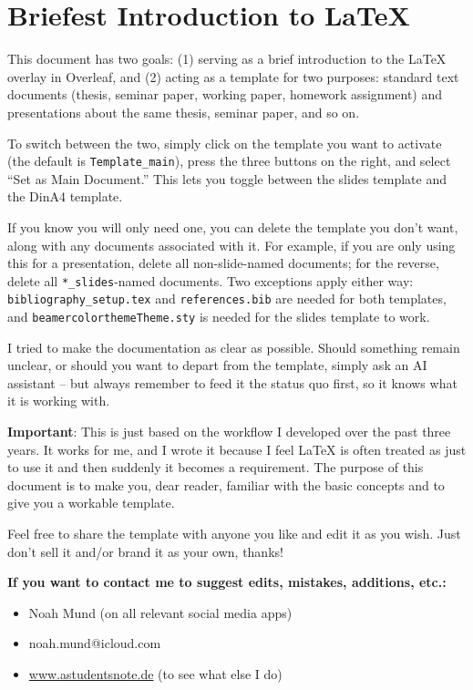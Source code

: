 \section{Briefest Introduction to LaTeX}
\label{sec:Intro}

This document has two goals: (1) serving as a brief introduction to the LaTeX overlay in Overleaf, and (2) acting as a template for two purposes: standard text documents (thesis, seminar paper, working paper, homework assignment) and presentations about the same thesis, seminar paper, and so on.

To switch between the two, simply click on the template you want to activate (the default is \texttt{Template\_main}), press the three buttons on the right, and select ``Set as Main Document.'' This lets you toggle between the slides template and the DinA4 template.

If you know you will only need one, you can delete the template you don't want, along with any documents associated with it. For example, if you are only using this for a presentation, delete all non-slide-named documents; for the reverse, delete all \texttt{*\_slides}-named documents. Two exceptions apply either way: \texttt{bibliography\_setup.tex} and \texttt{references.bib} are needed for both templates, and \texttt{beamercolorthemeTheme.sty} is needed for the slides template to work.

I tried to make the documentation as clear as possible. Should something remain unclear, or should you want to depart from the template, simply ask an AI assistant -- but always remember to feed it the status quo first, so it knows what it is working with.

\textbf{Important}: This is just based on the workflow I developed over the past three years. It works for me, and I wrote it because I feel LaTeX is often treated as just to use it and then suddenly it becomes a requirement. The purpose of this document is to make you, dear reader, familiar with the basic concepts and to give you a workable template. 

Feel free to share the template with anyone you like and edit it as you wish. Just don't sell it and/or brand it as your own, thanks! 

\textbf{If you want to contact me to suggest edits, mistakes, additions, etc.:} 

\begin{itemize}
    \item Noah Mund (on all relevant social media apps)
    \item noah.mund@icloud.com
    \item \url{www.astudentsnote.de} (to see what else I do) 
\end{itemize}

